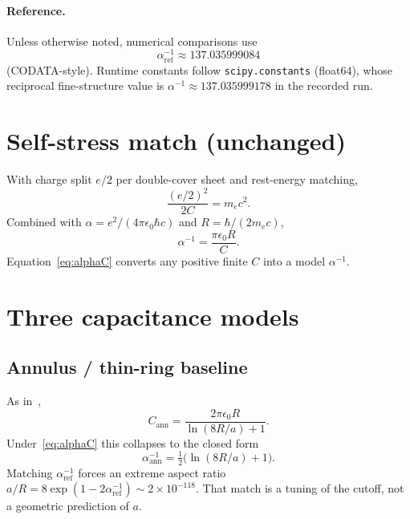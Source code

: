 \documentclass[11pt,a4paper]{article}
\begin{document}
\paragraph{Reference.}
Unless otherwise noted, numerical comparisons use
\begin{equation}
\alpha^{-1}_{\mathrm{ref}} \approx 137.035999084
\end{equation}
(CODATA-style).  Runtime constants follow \texttt{scipy.constants}
(float64), whose reciprocal fine-structure value is
$\alpha^{-1}\approx 137.035999178$ in the recorded run.

\section{Self-stress match (unchanged)}
\label{sec:match}

With charge split $e/2$ per double-cover sheet and rest-energy matching,
\begin{equation}
\label{eq:Ecap}
\frac{(e/2)^2}{2C} = m_e c^2.
\end{equation}
Combined with $\alpha=e^2/(4\pi\epsilon_0\hbar c)$ and
$R=\hbar/(2m_e c)$,
\begin{equation}
\label{eq:alphaC}
\alpha^{-1} = \frac{\pi\epsilon_0 R}{C}.
\end{equation}
Equation~\eqref{eq:alphaC} converts any positive finite $C$ into a model
$\alpha^{-1}$.

\section{Three capacitance models}
\label{sec:models}

\subsection{Annulus / thin-ring baseline}
\label{sec:annulus}

As in~\cite{mobius2026},
\begin{equation}
\label{eq:Cann}
C_{\mathrm{ann}}
=
\frac{2\pi\epsilon_0 R}{\ln(8R/a)+1}.
\end{equation}
Under~\eqref{eq:alphaC} this collapses to the closed form
\begin{equation}
\alpha^{-1}_{\mathrm{ann}} = \tfrac12\bigl(\ln(8R/a)+1\bigr).
\end{equation}
Matching $\alpha^{-1}_{\mathrm{ref}}$ forces an extreme aspect ratio
$a/R = 8\exp(1-2\alpha^{-1}_{\mathrm{ref}})\sim 2\times 10^{-118}$.
That match is a tuning of the cutoff, not a geometric prediction of $a$.
\end{document}
